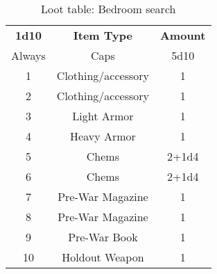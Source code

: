 \documentclass[11pt,a4paper,twocolumn]{book}
\begin{document}
        \begin{table}
        \centering
        \caption{Loot table: Bedroom search}
        \begin{tabular}{|c|c|c|}
           \hline
           \textbf{1d10}    & \textbf{Item Type}    & \textbf{Amount}  \\ 
                    Always  &   Caps                & 5d10          \\
                    1       &  Clothing/accessory   & 1           \\
                    2       &  Clothing/accessory   & 1        \\
                    3       &  Light Armor          & 1          \\ 
                    4       &  Heavy Armor          & 1          \\    
                    5       &  Chems                & 2+1d4         \\
                    6       &  Chems                & 2+1d4          \\  
                    7       &  Pre-War Magazine     & 1           \\  
                    8       &  Pre-War Magazine     & 1         \\
                    9       &  Pre-War Book         & 1           \\
                    10      &  Holdout Weapon       & 1   \\ \hline
        \end{tabular}
        \label{tab:my_label}
    \end{table}
   
\end{document}
